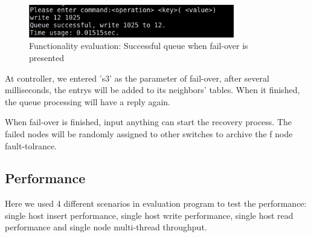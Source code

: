 \documentclass[11pt,oneside,a4paper]{article}
\begin{document}
\begin{figure}[h]
    \centering
    \includegraphics[width=0.8\textwidth]{figures/Evaluation_func_fail2.png}
    
    \caption{Functionality evaluation: Successful queue when fail-over is presented}
    \label{fig:Eva_func_fail}
\end{figure}

At controller, we entered 's3' as the parameter of fail-over, after several milliseconds, the entrys will be added to its neighbors' tables. When it finished, the queue processing will have a reply again.

When fail-over is finished, input anything can start the recovery process. The failed nodes will be randomly assigned to other switches to archive the f node fault-tolrance.

\subsection{Performance}

Here we used 4 different scenarios in evaluation program to test the performance: single host insert performance, single host write performance, single host read performance and single node multi-thread throughput.
\end{document}
